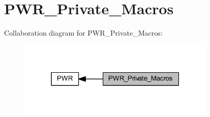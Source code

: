 \hypertarget{group___p_w_r___private___macros}{}\section{P\+W\+R\+\_\+\+Private\+\_\+\+Macros}
\label{group___p_w_r___private___macros}
Collaboration diagram for P\+W\+R\+\_\+\+Private\+\_\+\+Macros\+:
\nopagebreak
\begin{figure}[H]
\begin{center}
\leavevmode
\includegraphics[width=268pt]{group___p_w_r___private___macros}
\end{center}
\end{figure}
